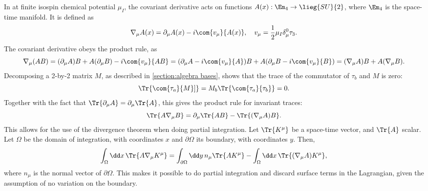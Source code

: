 \documentclass{article}
\begin{document}
In \chpt at finite isospin chemical potential $\mu_I$, the covariant derivative acts on functions $A(x): \Em_4 \rightarrow \lieg{SU}{2}$, where $\Em_4$ is the space-time manifold. It is defined as 
\begin{equation}
    \nabla_\mu A(x) = \partial_\mu A(x) - i \com{v_\mu}{A(x)}, 
    \quad v_\mu = \frac{1}{2} \mu_I \delta_\mu^0 \tau_3.
\end{equation}
The covariant derivative obeys the product rule, as
\begin{equation*}
    \nabla_\mu (A B) 
    = (\partial_\mu A) B + A (\partial_\mu B) - i \com{v_\mu}{AB}
    = (\partial_\mu A - i \com{v_\mu}{A})B + A(\partial_\mu B- i \com{v_\mu}{B}) 
    = (\nabla_\mu A)B + A (\nabla_\mu B).
\end{equation*}
Decomposing a 2-by-2 matrix $M$, as described in \autoref{section:algebra bases}, shows that the trace of the commutator of $\tau_b$ and $M$ is zero:
\begin{equation*}
    \Tr{\com{\tau_a}{M}]} = M_b\Tr{ \com{\tau_a}{\tau_b}} = 0.
\end{equation*}
Together with the fact that $\Tr{\partial_\mu A} = \partial_\mu \Tr{A}$, this gives the product rule for invariant traces:
\begin{equation*}
    \Tr{A \nabla_\mu B} = \partial_\mu \Tr{AB} - \Tr{(\nabla_\mu A) B}.
\end{equation*}
This allows for the use of the divergence theorem when doing partial integration.
Let $\Tr{K^\mu}$ be a space-time vector, and $\Tr{A}$ scalar. 
Let $\Omega$ be the domain of integration, with coordinates $x$ and $\partial \Omega$ its boundary, with coordinates $y$. Then, 
\begin{align*}
    \int_\Omega \dd x \, \Tr{A \nabla_\mu K^\mu} = \int_{\partial\Omega} \dd y\, n_\mu \Tr{A K^\mu} - \int_\Omega \dd x \, \Tr{(\nabla_\mu A) K^\mu},
\end{align*}
where $n_\mu$ is the normal vector of $\partial \Omega$.\cite{Carroll:space-time}
This makes it possible to do partial integration and discard surface terms in the \chpt Lagrangian, given the assumption of no variation on the boundary.
\end{document}

